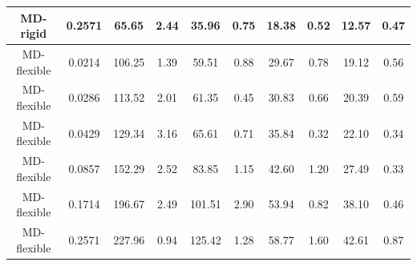\documentclass[5p,times]{elsarticle}
\begin{document}
\begin{table}[ht]
\begin{tabular}{cc|cc|cc|cc|cc}
MD-rigid    & 0.2571 & 65.65  & 2.44 & 35.96  & 0.75 & 18.38 & 0.52 & 12.57 & 0.47 \\
\hline
MD-flexible & 0.0214 & 106.25 & 1.39 & 59.51  & 0.88 & 29.67 & 0.78 & 19.12 & 0.56 \\
MD-flexible & 0.0286 & 113.52 & 2.01 & 61.35  & 0.45 & 30.83 & 0.66 & 20.39 & 0.59 \\
MD-flexible & 0.0429 & 129.34 & 3.16 & 65.61  & 0.71 & 35.84 & 0.32 & 22.10 & 0.34 \\
MD-flexible & 0.0857 & 152.29 & 2.52 & 83.85  & 1.15 & 42.60 & 1.20 & 27.49 & 0.33 \\
MD-flexible & 0.1714 & 196.67 & 2.49 & 101.51 & 2.90 & 53.94 & 0.82 & 38.10 & 0.46 \\
MD-flexible & 0.2571 & 227.96 & 0.94 & 125.42 & 1.28 & 58.77 & 1.60 & 42.61 & 0.87
\end{tabular}

\end{table}
\end{document}
